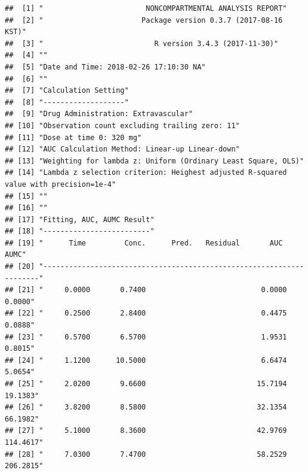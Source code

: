 \documentclass[9pt,]{krantz}
\begin{document}
\begin{verbatim}
##  [1] "                        NONCOMPARTMENTAL ANALYSIS REPORT"                           
##  [2] "                       Package version 0.3.7 (2017-08-16 KST)"                      
##  [3] "                          R version 3.4.3 (2017-11-30)"                             
##  [4] ""                                                                                   
##  [5] "Date and Time: 2018-02-26 17:10:30 NA"                                              
##  [6] ""                                                                                   
##  [7] "Calculation Setting"                                                                
##  [8] "-------------------"                                                                
##  [9] "Drug Administration: Extravascular"                                                 
## [10] "Observation count excluding trailing zero: 11"                                      
## [11] "Dose at time 0: 320 mg"                                                             
## [12] "AUC Calculation Method: Linear-up Linear-down"                                      
## [13] "Weighting for lambda z: Uniform (Ordinary Least Square, OLS)"                       
## [14] "Lambda z selection criterion: Heighest adjusted R-squared value with precision=1e-4"
## [15] ""                                                                                   
## [16] ""                                                                                   
## [17] "Fitting, AUC, AUMC Result"                                                          
## [18] "-------------------------"                                                          
## [19] "      Time         Conc.      Pred.   Residual       AUC       AUMC"                
## [20] "---------------------------------------------------------------------"              
## [21] "     0.0000       0.7400                           0.0000     0.0000"               
## [22] "     0.2500       2.8400                           0.4475     0.0888"               
## [23] "     0.5700       6.5700                           1.9531     0.8015"               
## [24] "     1.1200      10.5000                           6.6474     5.0654"               
## [25] "     2.0200       9.6600                          15.7194    19.1383"               
## [26] "     3.8200       8.5800                          32.1354    66.1982"               
## [27] "     5.1000       8.3600                          42.9769   114.4617"               
## [28] "     7.0300       7.4700                          58.2529   206.2815"               

\end{verbatim}
\end{document}
